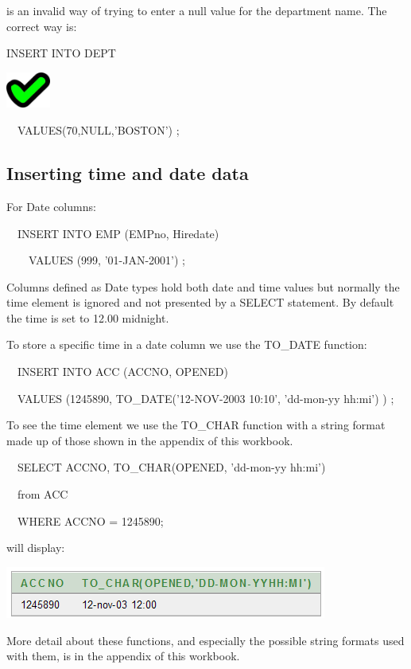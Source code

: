 is an invalid way of trying to enter a null value for the department name.  The correct way is:

INSERT INTO DEPT

\begin{center}
  
\includegraphics[width=1.443cm,height=1.184cm]{images/img (27).png}

\end{center}
\ \ VALUES(70,NULL,'BOSTON') ;

\subsection{Inserting time and date data}
For Date columns:

\ \ INSERT INTO EMP (EMPno, Hiredate)

\ \ \ \ VALUES (999, '01-JAN-2001') ;

Columns defined as Date types hold both date and time values but normally the time element is ignored and not presented by a SELECT statement.  By default the time is set to 12.00 midnight.

To store a specific time in a date column we use the TO\_DATE function:

\ \ INSERT INTO ACC (ACCNO, OPENED)

\ \ VALUES (1245890, TO\_DATE('12-NOV-2003 10:10', 'dd-mon-yy hh:mi') ) ;

To see the time element we use the TO\_CHAR function with a string format made up of those shown in the appendix of this workbook.

\ \ SELECT ACCNO, TO\_CHAR(OPENED, 'dd-mon-yy hh:mi') 

\ \ from ACC

\ \ WHERE ACCNO = 1245890;

will display:

   
\includegraphics[width=10.576cm,height=1.706cm]{images/img (42).png}
 

More detail about these functions, and especially the possible string formats used with them, is in the appendix of this workbook.

